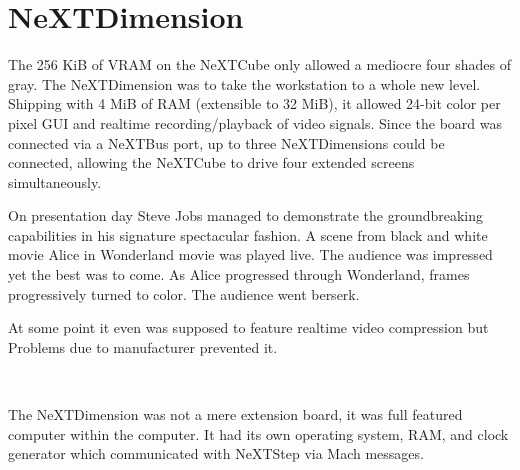 \section{NeXTDimension}
The 256 KiB of VRAM on the NeXTCube only allowed a mediocre four shades of gray. The NeXTDimension was to take the workstation to a whole new level. Shipping with 4 MiB of RAM (extensible to 32 MiB), it allowed 24-bit color per pixel GUI and realtime recording/playback of video signals. Since the board was connected via a NeXTBus port, up to three NeXTDimensions could be connected, allowing the NeXTCube to drive four extended screens simultaneously.\\
\par
On presentation day Steve Jobs managed to demonstrate the groundbreaking capabilities in his signature spectacular fashion. A scene from black and white movie Alice in Wonderland movie was played live. The audience was impressed yet the best was to come. As Alice progressed through Wonderland, frames progressively turned to color. The audience went berserk.\\
\par
At some point it even was supposed to feature realtime video compression but Problems due to manufacturer prevented it.\\
\par
{}\\
\par
The NeXTDimension was not a mere extension board, it was full featured computer within the computer. It had its own operating system, RAM, and clock generator which communicated with NeXTStep via Mach messages.\\
\par
{}
\par
